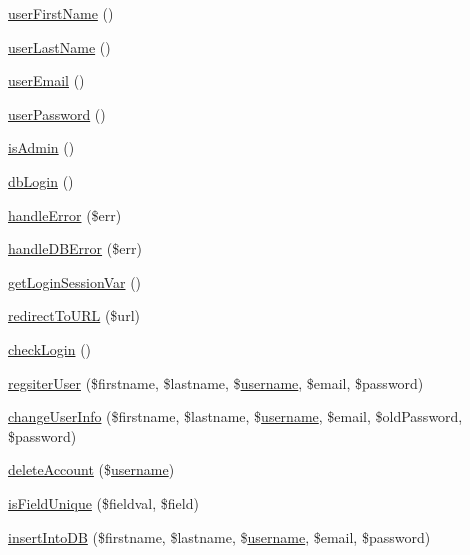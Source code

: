 \begin{DoxyCompactItemize}
\item 
\hyperlink{classdb_validator_aa27eec2b94f77b764a09f36b9a4885e7}{user\-First\-Name} ()
\item 
\hyperlink{classdb_validator_aa20388700cde12a2aa68c0b5415c8d3a}{user\-Last\-Name} ()
\item 
\hyperlink{classdb_validator_aad2ba58e8767f5d8d04c1b99f5bd0958}{user\-Email} ()
\item 
\hyperlink{classdb_validator_a560344e934ed8cd8b3af688d64ab4d25}{user\-Password} ()
\item 
\hyperlink{classdb_validator_aabf23b66cd362adaa508de5bfb22706a}{is\-Admin} ()
\item 
\hyperlink{classdb_validator_ab4a1fda4df5c5cb8c50b4c9fe679960b}{db\-Login} ()
\item 
\hyperlink{classdb_validator_a2e0004af8cba0204fd735d882612d989}{handle\-Error} (\$err)
\item 
\hyperlink{classdb_validator_a0f2c8109fd9dec1031a711fb42e94502}{handle\-D\-B\-Error} (\$err)
\item 
\hyperlink{classdb_validator_af2f1a88c934b9701eb257f35fd257a05}{get\-Login\-Session\-Var} ()
\item 
\hyperlink{classdb_validator_a3e9d59f460abd5b96b6b693103cd8839}{redirect\-To\-U\-R\-L} (\$url)
\item 
\hyperlink{classdb_validator_ab8e90adf3e4b15eea283c4ea450a4288}{check\-Login} ()
\item 
\hyperlink{classdb_validator_afe99ea73ddef3bd2227b63d601f7dcd1}{regsiter\-User} (\$firstname, \$lastname, \$\hyperlink{classdb_validator_a7475524fbb2e38dd6c9f7a6661b0bb81}{username}, \$email, \$password)
\item 
\hyperlink{classdb_validator_ab14beda16b51e608c9317706ddf9cb9f}{change\-User\-Info} (\$firstname, \$lastname, \$\hyperlink{classdb_validator_a7475524fbb2e38dd6c9f7a6661b0bb81}{username}, \$email, \$old\-Password, \$password)
\item 
\hyperlink{classdb_validator_a7eda21a465edc729c0f3801016e9c64c}{delete\-Account} (\$\hyperlink{classdb_validator_a7475524fbb2e38dd6c9f7a6661b0bb81}{username})
\item 
\hyperlink{classdb_validator_ad001bae039e1436f8411bbcccc783a48}{is\-Field\-Unique} (\$fieldval, \$field)
\item 
\hyperlink{classdb_validator_afb82cd177f4750eaa831cdb41fddd4a1}{insert\-Into\-D\-B} (\$firstname, \$lastname, \$\hyperlink{classdb_validator_a7475524fbb2e38dd6c9f7a6661b0bb81}{username}, \$email, \$password)
\item 

\end{DoxyCompactItemize}
